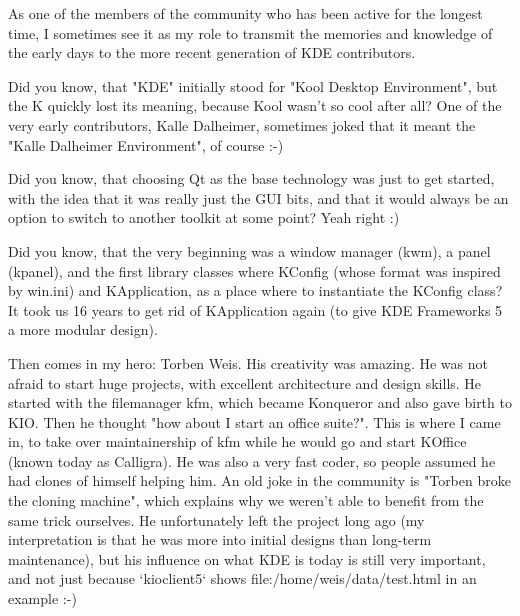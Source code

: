 

\noindent{}As one of the members of the community who has been active for the longest time, I sometimes see it as my role to transmit the memories and knowledge of the early days to the more recent generation of KDE contributors.

Did you know, that "KDE" initially stood for "Kool Desktop Environment", but the K quickly lost its meaning, because Kool wasn't so cool after all?
One of the very early contributors, Kalle Dalheimer, sometimes joked that it meant the "Kalle Dalheimer Environment", of course :-)

Did you know, that choosing Qt as the base technology was just to get started, with the idea that it was really just the GUI bits, and that it would always be an option to switch to another toolkit at some point? Yeah right :)

Did you know, that the very beginning was a window manager (kwm), a panel (kpanel), and the first library classes where KConfig (whose format was inspired by win.ini) and KApplication, as a place where to instantiate the KConfig class? It took us 16 years to get rid of KApplication again (to give KDE Frameworks 5 a more modular design).

Then comes in my hero: Torben Weis. His creativity was amazing. He was not afraid to start huge projects, with excellent architecture and design skills. He started with the filemanager kfm, which became Konqueror and also gave birth to KIO. Then he thought "how about I start an office suite?". This is where I came in, to take over maintainership of kfm while he would go and start KOffice (known today as Calligra).
He was also a very fast coder, so people assumed he had clones of himself helping him. An old joke in the community is "Torben broke the cloning machine", which explains why we weren't able to benefit from the same trick ourselves.
He unfortunately left the project long ago (my interpretation is that he was more into initial designs than long-term maintenance), but his influence on what KDE is today is still very important, and not just because `kioclient5` shows file:/home/weis/data/test.html in an example :-)

